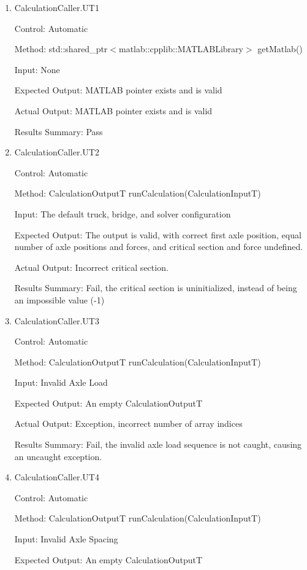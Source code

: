 \documentclass[12pt, titlepage]{article}
\begin{document}
\begin{enumerate}
  
  \item {CalculationCaller.UT1}

  Control: Automatic

  Method: std::shared\_ptr$<$matlab::cpplib::MATLABLibrary$>$ getMatlab()

  Input: None

  Expected Output: MATLAB pointer exists and is valid

  Actual Output: MATLAB pointer exists and is valid

  Results Summary: Pass

  \item {CalculationCaller.UT2}

  Control: Automatic

  Method: CalculationOutputT runCalculation(CalculationInputT)

  Input: The default truck, bridge, and solver configuration

  Expected Output: The output is valid, with correct first axle position,
  equal number of axle positions and forces, and critical section and force undefined.

  Actual Output: Incorrect critical section.

  Results Summary: Fail, the critical section is uninitialized, instead of being
  an impossible value (-1)

  \item {CalculationCaller.UT3}

  Control: Automatic

  Method: CalculationOutputT runCalculation(CalculationInputT)

  Input: Invalid Axle Load

  Expected Output: An empty CalculationOutputT

  Actual Output: Exception, incorrect number of array indices

  Results Summary: Fail, the invalid axle load sequence is not caught, causing an uncaught exception.

  \item {CalculationCaller.UT4}

  Control: Automatic

  Method: CalculationOutputT runCalculation(CalculationInputT)

  Input: Invalid Axle Spacing

  Expected Output: An empty CalculationOutputT


\end{enumerate}
\end{document}
